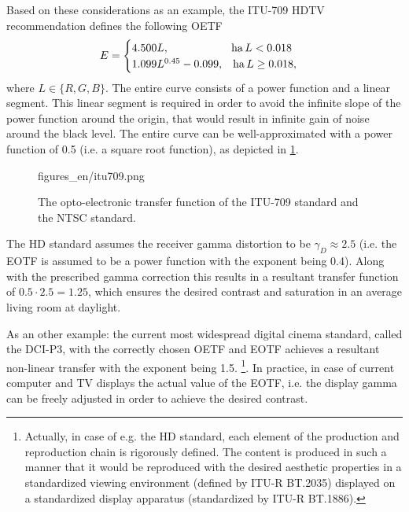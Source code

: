 Based on these considerations as an example, the ITU-709 HDTV recommendation defines the following OETF
\begin{equation}
E = 
\begin{cases}
4.500 L, \hspace{20mm} \mathrm{ha}\, L < 0.018 \\
1.099 L^{0.45} - 0.099, \hspace{3mm} \mathrm{ha}\, L \geq 0.018,
\end{cases}
\end{equation}
where $L \in \{ R, G, B \}$.
The entire curve consists of a power function and a linear segment.
This linear segment is required in order to avoid the infinite slope of the power function around the origin, that would result in infinite gain of noise around the black level.
The entire curve can be well-approximated with a power function of 0.5 (i.e. a square root function), as depicted in \ref{Fig:itu709}.

\begin{figure}[]
	\centering
	\begin{overpic}[width = 0.7\columnwidth ]{figures_en/itu709.png}
	\end{overpic}
	\caption{The opto-electronic transfer function of the ITU-709 standard and the NTSC standard.}
	\label{Fig:itu709}
\end{figure}
The HD standard assumes the receiver gamma distortion to be $\gamma_D \approx 2.5$ (i.e. the EOTF is assumed to be a power function with the exponent being 0.4).
Along with the prescribed gamma correction this results in a resultant transfer function of $0.5 \cdot 2.5 = 1.25$, which ensures the desired contrast and saturation in an average living room at daylight.

As an other example: the current most widespread digital cinema standard, called the DCI-P3, with the correctly chosen OETF and EOTF achieves a resultant non-linear transfer with the exponent being 1.5.
\footnote{
Actually, in case of e.g. the HD standard, each element of the production and reproduction chain is rigorously defined.
The content is produced in such a manner that it would be reproduced with the desired aesthetic properties in a standardized viewing environment (defined by ITU-R BT.2035) displayed on a standardized display apparatus (standardized by ITU-R BT.1886).}.
In practice, in case of current computer and TV displays the actual value of the EOTF, i.e. the display gamma can be freely adjusted in order to achieve the desired contrast.


